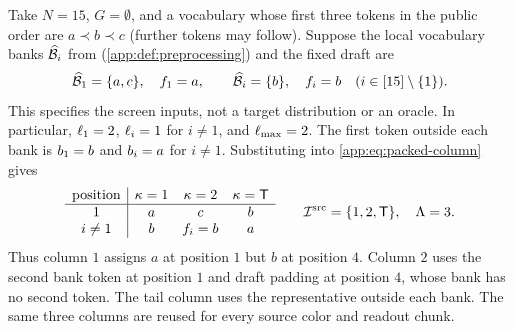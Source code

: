 \begin{example}
\label{ex:algorithm-banks-20260918}
Take $N=15$, $G=\emptyset$, and a vocabulary whose first three tokens in
the public order are $a\prec b\prec c$ (further tokens may follow).
Suppose the local vocabulary banks $\widehat{\mathcal B}_{i}$ from
 (\cref{app:def:preprocessing}) and the fixed draft are
\[
 \widehat{\mathcal B}_{1}=\{a,c\},\quad f_{1}=a,
 \qquad
 \widehat{\mathcal B}_{i}=\{b\},\quad f_{i}=b
 \quad (i\in[15]\setminus\{1\}).
\]
This specifies the screen inputs, not a target distribution or an oracle.
In particular, $\ell_{1}=2$, $\ell_{i}=1$ for $i\ne1$, and
$\ell_{\max}=2$.  The first token outside each bank is
$b_{1}=b$ and $b_{i}=a$ for $i\ne1$.
Substituting into \eqref{app:eq:packed-column} gives
\[
\begin{array}{c|ccc}
 \text{position}&\kappa=1&\kappa=2&\kappa=\mathsf T\\ \hline
 1& a&c&b\\
 i\ne1&b&f_{i}=b&a
\end{array}
 \qquad
 \mathcal I^{\mathrm{src}}=\{1,2,\mathsf T\},\quad \Lambda=3.
\]
Thus column $1$ assigns $a$ at position $1$ but $b$ at position $4$.
Column $2$ uses the second bank token at position $1$ and draft padding
at position $4$, whose bank has no second token.  The tail column uses
the representative outside each bank.  The same three columns are
reused for every source color and readout chunk.
\end{example}
